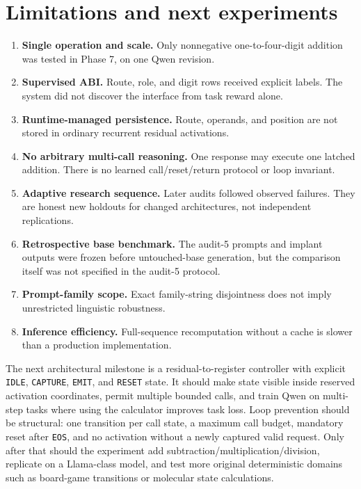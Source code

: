 \documentclass[11pt]{article}
\newcommand{\code}[1]{\texttt{#1}}
\begin{document}
\section{Limitations and next experiments}

\begin{enumerate}
\item \textbf{Single operation and scale.} Only nonnegative one-to-four-digit
      addition was tested in Phase 7, on one Qwen revision.
\item \textbf{Supervised ABI.} Route, role, and digit rows received explicit
      labels. The system did not discover the interface from task reward alone.
\item \textbf{Runtime-managed persistence.} Route, operands, and position are
      not stored in ordinary recurrent residual activations.
\item \textbf{No arbitrary multi-call reasoning.} One response may execute one
      latched addition. There is no learned call/reset/return protocol or loop
      invariant.
\item \textbf{Adaptive research sequence.} Later audits followed observed
      failures. They are honest new holdouts for changed architectures, not
      independent replications.
\item \textbf{Retrospective base benchmark.} The audit-5 prompts and implant
      outputs were frozen before untouched-base generation, but the comparison
      itself was not specified in the audit-5 protocol.
\item \textbf{Prompt-family scope.} Exact family-string disjointness does not
      imply unrestricted linguistic robustness.
\item \textbf{Inference efficiency.} Full-sequence recomputation without a
      cache is slower than a production implementation.
\end{enumerate}

The next architectural milestone is a residual-to-register controller with
explicit \code{IDLE}, \code{CAPTURE}, \code{EMIT}, and \code{RESET} state.
It should make state visible inside reserved activation coordinates, permit
multiple bounded calls, and train Qwen on multi-step tasks where using the
calculator improves task loss. Loop prevention should be structural: one
transition per call state, a maximum call budget, mandatory reset after
\code{EOS}, and no activation without a newly captured valid request. Only
after that should the experiment add subtraction/multiplication/division,
replicate on a Llama-class model, and test more original deterministic domains
such as board-game transitions or molecular state calculations.
\end{document}
